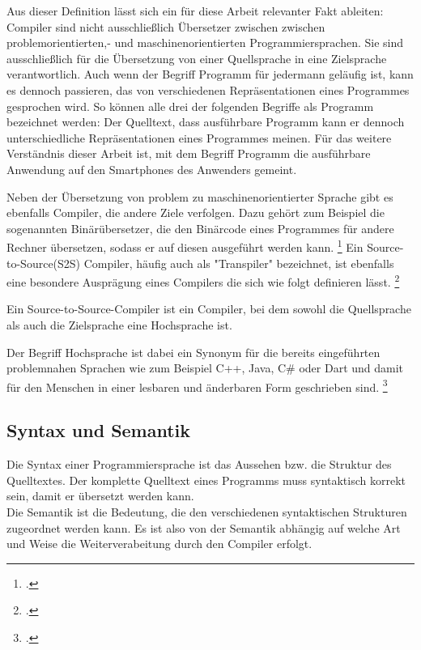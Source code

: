 Aus dieser Definition lässt sich ein für diese Arbeit relevanter Fakt ableiten: Compiler sind nicht ausschließlich Übersetzer zwischen zwischen problemorientierten,- und maschinenorientierten Programmiersprachen.  Sie sind ausschließlich für die Übersetzung von einer Quellsprache in eine Zielsprache verantwortlich.  Auch wenn der Begriff Programm für jedermann geläufig ist,  kann es dennoch passieren,  das von verschiedenen Repräsentationen eines Programmes gesprochen wird.  So können alle drei der folgenden Begriffe als Programm bezeichnet werden: Der Quelltext, dass ausführbare Programm kann er dennoch unterschiedliche Repräsentationen eines Programmes meinen.  Für das weitere Verständnis dieser Arbeit ist,  mit dem Begriff Programm die ausführbare Anwendung auf den Smartphones des Anwenders gemeint.  

Neben der Übersetzung von problem zu maschinenorientierter Sprache gibt es ebenfalls Compiler, die andere Ziele verfolgen. Dazu gehört zum Beispiel die sogenannten Binärübersetzer,  die den Binärcode eines Programmes für andere Rechner übersetzen, sodass er auf diesen ausgeführt werden kann.  \footcite[Vgl.][S. 27]{Ullmann2008} Ein Source-to-Source(S2S) Compiler,  häufig auch als "Transpiler" bezeichnet,  ist ebenfalls eine besondere Ausprägung eines Compilers die sich wie folgt definieren lässt.  \footcite[Vgl.][S. 1629]{IJCSIT2015}
\begin{Def}
Ein Source-to-Source-Compiler ist ein Compiler, bei dem sowohl die Quellsprache als auch die Zielsprache eine Hochsprache ist.
\end{Def}
\vspace{-1em}

Der Begriff Hochsprache ist dabei ein Synonym für die bereits eingeführten problemnahen Sprachen wie zum Beispiel C++,  Java,  C\# oder Dart und damit für den Menschen in einer lesbaren und änderbaren Form geschrieben sind. \footcite[Vgl.][S. 9]{Eisenecker2008} 



\subsection{ Syntax und Semantik}
Die Syntax einer Programmiersprache ist das Aussehen bzw. die Struktur des Quelltextes. Der komplette Quelltext eines Programms muss syntaktisch korrekt sein, damit er übersetzt werden kann.  \\
Die Semantik ist die Bedeutung, die den verschiedenen syntaktischen Strukturen zugeordnet werden kann. Es ist also von der Semantik abhängig auf welche Art und Weise die Weiterverabeitung durch den Compiler erfolgt. 




